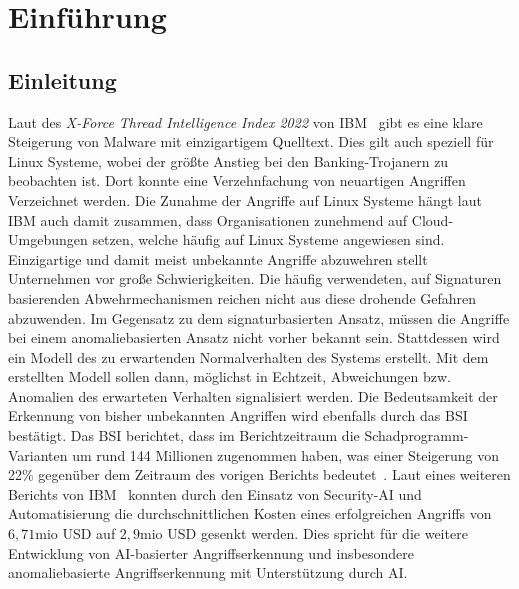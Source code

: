 \chapter{Einführung}\label{ch:introduction} %
\section{Einleitung}\label{sec:einleitung}
Laut des \textit{X-Force Thread Intelligence Index 2022} von IBM~\cite{IBM} gibt es eine klare Steigerung von Malware mit einzigartigem Quelltext.
Dies gilt auch speziell für Linux Systeme, wobei der größte Anstieg bei den Banking-Trojanern zu beobachten ist.
Dort konnte eine Verzehnfachung von neuartigen Angriffen Verzeichnet werden.
Die Zunahme der Angriffe auf Linux Systeme hängt laut IBM auch damit zusammen, dass Organisationen zunehmend auf Cloud-Umgebungen setzen, welche häufig auf Linux Systeme angewiesen sind.
Einzigartige und damit meist unbekannte Angriffe abzuwehren stellt Unternehmen vor große Schwierigkeiten.
Die häufig verwendeten, auf Signaturen basierenden Abwehrmechanismen reichen nicht aus diese drohende Gefahren abzuwenden.
Im Gegensatz zu dem signaturbasierten Ansatz, müssen die Angriffe bei einem anomaliebasierten Ansatz nicht vorher bekannt sein.
Stattdessen wird ein Modell des zu erwartenden Normalverhalten des Systems erstellt.
Mit dem erstellten Modell sollen dann, möglichst in Echtzeit, Abweichungen bzw. Anomalien des erwarteten Verhalten signalisiert werden.
Die Bedeutsamkeit der Erkennung von bisher unbekannten Angriffen wird ebenfalls durch das \ac{BSI} bestätigt.
Das \ac{BSI} berichtet, dass im Berichtzeitraum die Schadprogramm-Varianten um rund 144 Millionen zugenommen haben, was einer Steigerung von 22\% gegenüber dem Zeitraum des vorigen Berichts bedeutet~\cite{BSI}.
Laut eines weiteren Berichts von IBM~\cite{IBM2} konnten durch den Einsatz von Security-\ac{AI} und Automatisierung die durchschnittlichen Kosten eines erfolgreichen Angriffs von $6,71$mio USD auf $2,9$mio USD gesenkt werden.
Dies spricht für die weitere Entwicklung von \ac{AI}-basierter Angriffserkennung und insbesondere anomaliebasierte Angriffserkennung mit Unterstützung durch \ac{AI}.

